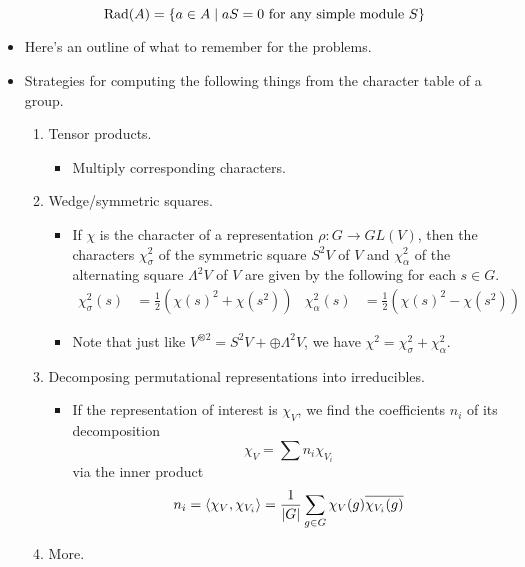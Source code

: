\documentclass[../notes.tex]{subfiles}
\begin{document}
\begin{itemize}
\begin{equation*}
        \operatorname{Rad}(A) = \{a\in A\mid aS=0\text{ for any simple module }S\}
    \end{equation*}
    \item Here's an outline of what to remember for the problems.
    \item Strategies for computing the following things from the character table of a group.
    \begin{enumerate}
        \item Tensor products.
        \begin{itemize}
            \item Multiply corresponding characters.
        \end{itemize}
        \item Wedge/symmetric squares.
        \begin{itemize}
            \item If $\chi$ is the character of a representation $\rho:G\to GL(V)$, then the characters $\chi_\sigma^2$ of the symmetric square $S^2V$ of $V$ and $\chi_\alpha^2$ of the alternating square $\Lambda^2V$ of $V$ are given by the following for each $s\in G$.
            \begin{align*}
                \chi_\sigma^2(s) &= \frac{1}{2}\left( \chi(s)^2+\chi(s^2) \right)&
                \chi_\alpha^2(s) &= \frac{1}{2}\left( \chi(s)^2-\chi(s^2) \right)
            \end{align*}
            \item Note that just like $V^{\otimes 2}=S^2V+\oplus\Lambda^2V$, we have $\chi^2=\chi_\sigma^2+\chi_\alpha^2$.
        \end{itemize}
        \item Decomposing permutational representations into irreducibles.
        \begin{itemize}
            \item If the representation of interest is $\chi_V$, we find the coefficients $n_i$ of its decomposition
            \begin{equation*}
                \chi_V = \sum n_i\chi_{V_i}
            \end{equation*}
            via the inner product
            \begin{equation*}
                n_i = \left\langle{\chi_V,\chi_{V_i}}\right\rangle = \frac{1}{|G|}\sum_{g\in G}\chi_V(g)\overline{\chi_{V_i}(g)}
            \end{equation*}
        \end{itemize}
        \item More.

\end{enumerate}
\end{itemize}
\end{document}
